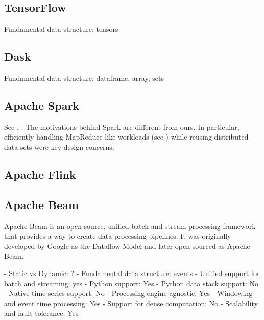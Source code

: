 \documentclass[11pt, reqno]{amsart}
\theoremstyle{definition}
\theoremstyle{remark}
\begin{document}
  \subsection{TensorFlow}
  Fundamental data structure: tensors

  \subsection{Dask}
  Fundamental data structure: dataframe, array, sets

  \subsection{Apache Spark}

  See \cite{ZhChFrShSt10}, \cite{ShMoAlNa19}. The motivations behind Spark are different
  from ours. In particular, efficiently handling MapReduce-like workloads (see
  \cite{DeGh08}) while reusing distributed data sets were key design concerns.

  \subsection{Apache Flink}

  \subsection{Apache Beam}

  Apache Beam is an open-source, unified batch and stream processing framework
  that provides a way to create data processing pipelines. It was originally developed
  by Google as the Dataflow Model and later open-sourced as Apache Beam.

  - Static vs Dynamic: ? - Fundamental data structure: events - Unified support for
  batch and streaming: yes - Python support: Yes - Python data stack support: No
  - Native time series support: No - Processing engine agnostic: Yes - Windowing
  and event time processing: Yes - Support for dense computation: No -
  Scalability and fault tolerance: Yes
\end{document}
